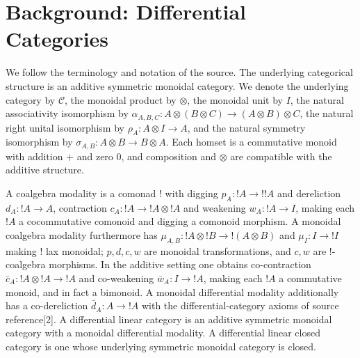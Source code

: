
\section*{Background: Differential Categories}
We follow the terminology and notation of the source.
The underlying categorical structure is an additive symmetric monoidal category.
We denote the underlying category by $\mathcal C$, the monoidal product by $\otimes$,
the monoidal unit by $I$, the natural associativity isomorphism by
$\alpha_{A,B,C}:A\otimes(B\otimes C)\to(A\otimes B)\otimes C$,
the natural right unital isomorphism by $\rho_A:A\otimes I\to A$,
and the natural symmetry isomorphism by $\sigma_{A,B}:A\otimes B\to B\otimes A$.
Each homset is a commutative monoid with addition $+$ and zero $0$, and composition
and $\otimes$ are compatible with the additive structure.

A coalgebra modality is a comonad $!$ with digging $p_A:!A\to!!A$ and
dereliction $d_A:!A\to A$, contraction $c_A:!A\to!A\otimes!A$ and
weakening $w_A:!A\to I$, making each $!A$ a cocommutative comonoid and
digging a comonoid morphism. A monoidal coalgebra modality furthermore has
$\mu_{A,B}:!A\otimes!B\to!(A\otimes B)$ and $\mu_I:I\to!I$ making
$!$ lax monoidal; $p,d,c,w$ are monoidal transformations, and $c,w$ are
$!$-coalgebra morphisms.
In the additive setting one obtains co-contraction
$\bar c_A:!A\otimes!A\to!A$ and co-weakening $\bar w_A:I\to!A$,
making each $!A$ a commutative monoid, and in fact a bimonoid.
A monoidal differential modality additionally has a co-dereliction
$\bar d_A:A\to!A$ with the differential-category axioms of source reference[2].
A differential linear category is an additive symmetric monoidal category with
a monoidal differential modality. A differential linear closed category is one
whose underlying symmetric monoidal category is closed.

